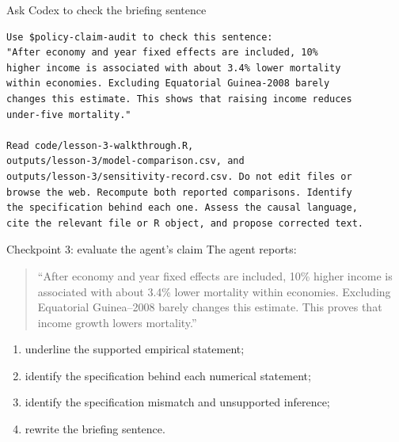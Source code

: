 \begin{frame}[fragile]{Ask Codex to check the briefing sentence}
\begin{lstlisting}
Use $policy-claim-audit to check this sentence:
"After economy and year fixed effects are included, 10%
higher income is associated with about 3.4% lower mortality
within economies. Excluding Equatorial Guinea-2008 barely
changes this estimate. This shows that raising income reduces
under-five mortality."

Read code/lesson-3-walkthrough.R,
outputs/lesson-3/model-comparison.csv, and
outputs/lesson-3/sensitivity-record.csv. Do not edit files or
browse the web. Recompute both reported comparisons. Identify
the specification behind each one. Assess the causal language,
cite the relevant file or R object, and propose corrected text.
\end{lstlisting}
\end{frame}


\begin{frame}{Checkpoint 3: evaluate the agent's claim}
  The agent reports:

  \begin{quote}\RaggedRight
    ``After economy and year fixed effects are included, 10\% higher income is
    associated with about 3.4\% lower mortality within economies. Excluding
    Equatorial Guinea--2008 barely changes this estimate. This proves that
    income growth lowers mortality.''
  \end{quote}


  \begin{enumerate}
    \item underline the supported empirical statement;
    \item identify the specification behind each numerical statement;
    \item identify the specification mismatch and unsupported inference;
    \item rewrite the briefing sentence.
  \end{enumerate}

\end{frame}
